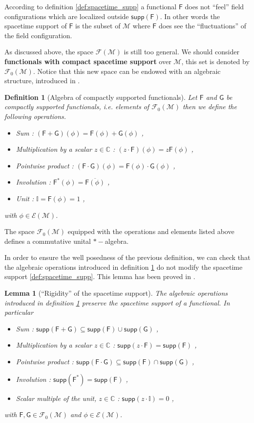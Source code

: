 \documentclass[11pt]{book}
\newcommand{\supp}{\mathsf{supp}}
\newcommand{\Ecal}{\mathcal{E}}
\newcommand{\Fcal}{\mathcal{F}}
\newcommand{\Mcal}{\mathcal{M}}
\newcommand{\Cbb}{\mathbb{C}}
\newcommand{\Ibb}{\mathbb{I}}
\newcommand{\Fsf}{\mathsf{F}}
\newcommand{\Gsf}{\mathsf{G}}
\theoremstyle{break}
\newtheorem{lemma}{Lemma}[chapter]
\newtheorem{definition}{Definition}[chapter]
\begin{document}
According to definition \ref{def:spacetime_supp} a functional $\Fsf$ does not ``feel'' field configurations which are localized outside $\supp(\Fsf)$. In other words the spacetime support of $\Fsf$ is the subset of $\Mcal$ where $\Fsf$ does see the ``fluctuations'' of the field configuration.


As discussed above, the space $\Fcal(\Mcal)$ is still too general. We should consider \textbf{functionals with compact spacetime support} over $\Mcal$, this set is denoted by $\Fcal_0(\Mcal)$. Notice that this new space can be endowed with an algebraic structure, introduced in \cite{brunetti_algebraic_2012}.


\begin{definition}[Algebra of compactly supported functionals] \label{def:algebra_comp_supp_func}
Let $\Fsf$ and $\Gsf$ be compactly supported functionals, i.e. elements of $\Fcal_0(\Mcal)$ then we define the following operations.
%
\begin{itemize}
\item Sum : $(\Fsf+\Gsf)(\phi) = \Fsf(\phi) + \Gsf(\phi)$ ,
\item Multiplication by a scalar $z\in\Cbb$ : $(z \cdot \Fsf)(\phi) = z \Fsf(\phi)$ ,
\item Pointwise product : $(\Fsf \cdot \Gsf)(\phi) = \Fsf(\phi) \cdot \Gsf(\phi)$ ,
\item Involution : $\Fsf^\ast(\phi) = \overline{\Fsf(\phi)}$ ,
\item Unit : $\Ibb = \Fsf(\phi) = 1$ ,
\end{itemize}
%
with $\phi \in \Ecal(\Mcal)$. 
\end{definition}


The space $\Fcal_0(\Mcal)$ equipped with the operations and elements listed above defines a commutative unital $\ast-$algebra.


In order to ensure the well posedness of the previous definition, we can check that the algebraic operations introduced in definition \ref{def:algebra_comp_supp_func} do not modify the spacetime support \ref{def:spacetime_supp}. This lemma has been proved in \cite{brunetti_algebraic_2012}.


\begin{lemma}[``Rigidity'' of the spacetime support]
The algebraic operations introduced in definition \ref{def:algebra_comp_supp_func} preserve the spacetime support of a functional. In particular
%
\begin{itemize}
\item Sum : $\supp(\Fsf + \Gsf) \subseteq \supp(\Fsf) \cup \supp(\Gsf)$ ,
\item Multiplication by a scalar $z\in\Cbb$ : $\supp(z\cdot\Fsf) = \supp(\Fsf)$ ,
\item Pointwise product : $\supp(\Fsf \cdot \Gsf) \subseteq \supp(\Fsf) \cap \supp(\Gsf)$ ,
\item Involution : $\supp(\Fsf^\ast) = \supp(\Fsf)$ ,
\item Scalar multiple of the unit, $z\in\Cbb$ : $\supp(z\cdot\Ibb) = 0 $ ,
\end{itemize}
%
with $\Fsf, \Gsf \in \Fcal_0(\Mcal)$ and $\phi \in \Ecal(\Mcal)$.
\end{lemma}
\end{document}
